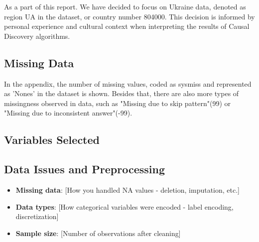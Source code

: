 \documentclass[main.tex]{subfiles}
\begin{document}
 


As a part of this report. We have decided to focus on Ukraine data, denoted as region UA in the dataset, or country number 804000. This decision is informed by personal experience and cultural context when interpreting the results of Causal Discovery algorithms. 

% 

\subsection{Missing Data}
In the appendix, the number of missing values, coded as sysmiss and represented as 'Nones' in the dataset is shown. Besides that, there are also more types of missingness observed in data, such as "Missing due to skip pattern"(99) or "Missing due to inconsistent answer"(-99).

% 



% 



\subsection{Variables Selected}

\subsection{Data Issues and Preprocessing}
\begin{itemize}
  \item \textbf{Missing data}: [How you handled NA values - deletion, imputation, etc.]
  \item \textbf{Data types}: [How categorical variables were encoded - label encoding, discretization]
  \item \textbf{Sample size}: [Number of observations after cleaning]
\end{itemize}

\end{document}
